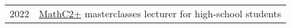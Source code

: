 
\begin{longtable}[l]{@{}p{} p{}}
    2022 & \href{https://www.mathc2plus.fr}{MathC2+} masterclasses lecturer for high-school students
\end{longtable}


